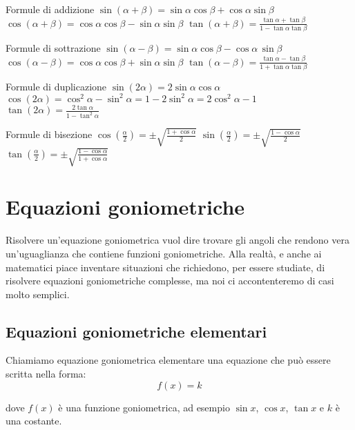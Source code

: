 \begin{itemize*}
 \item Formule di addizione
  \subitem $\sin(\alpha + \beta)=\sin\alpha \cos\beta + \cos\alpha \sin\beta$
  \subitem $\cos(\alpha + \beta)=\cos\alpha \cos\beta - \sin\alpha \sin\beta$
  \subitem $\tan(\alpha + \beta)=\frac {\tan\alpha + \tan\beta} 
                                        {1 - \tan\alpha \tan\beta}$
 \item Formule di sottrazione
  \subitem $\sin(\alpha - \beta)=\sin\alpha \cos\beta - \cos\alpha \, 
\sin\beta$
  \subitem $\cos(\alpha - \beta)=\cos\alpha \cos\beta + \sin\alpha \sin\beta$
  \subitem $\tan(\alpha - \beta)=\frac {\tan\alpha - \tan\beta} 
                                        {1 + \tan\alpha \tan\beta}$
 \item Formule di duplicazione
  \subitem $\sin(2\alpha)=2\sin\alpha \cos\alpha$
  \subitem $\cos(2\alpha)=\cos^2\alpha - \sin^2\alpha = 1 - 2\sin^{2}\alpha = 
            2\cos^{2}\alpha - 1$
  \subitem $\tan(2\alpha)=\frac{2\tan\alpha}{1 - \tan^2\alpha}$
 \item Formule di bisezione
  \subitem $\cos\left(\frac{\alpha} 2\right)=\pm\sqrt{\frac{1+\cos\alpha}{2} 
}$
  \subitem $\sin\left(\frac{\alpha} 2\right)=\pm\sqrt{\frac{1-\cos\alpha}{2} 
}$
  \subitem $\tan\left(\frac{\alpha} 2\right)=\pm\sqrt{\frac{1-\cos\alpha}
                                                           {1+\cos\alpha}}$
\end{itemize*}

\section{Equazioni goniometriche}
\label{sec:gonio_equazionigonio}

Risolvere un'equazione goniometrica vuol dire trovare gli angoli che rendono 
vera un'uguaglianza che contiene funzioni goniometriche. 
Alla realtà, e anche ai matematici piace inventare situazioni che richiedono, 
per essere studiate, di risolvere equazioni goniometriche complesse, ma noi 
ci 
accontenteremo di casi molto semplici.

\subsection{Equazioni goniometriche elementari}

Chiamiamo equazione goniometrica elementare una equazione che può essere 
scritta nella forma:
\[f(x)=k\]

dove $f(x)$ è una funzione goniometrica, ad esempio $\sin x$, $\cos x$, 
$\tan x$ e $k$ è una costante.

